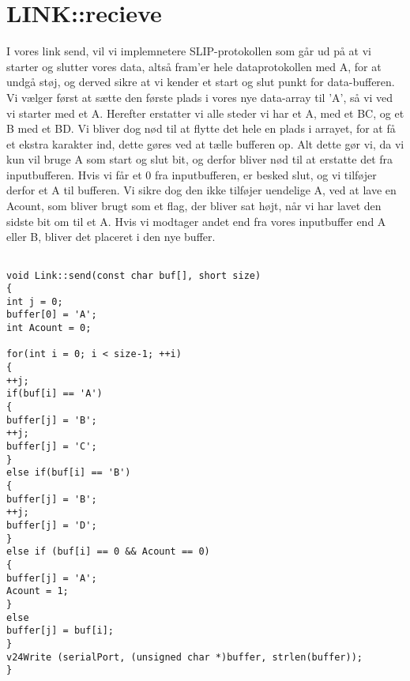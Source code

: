 \graphicspath{{Chapters/Displaymontering/}}

\chapter{LINK::recieve}

\lstset{language=C++}          %


I vores link send, vil vi implemnetere SLIP-protokollen som går ud på at vi starter og slutter vores data, altså fram'er hele dataprotokollen med A, for at undgå støj, og derved sikre at vi kender et start og slut punkt for data-bufferen. Vi vælger først at sætte den første plads i vores nye data-array til 'A', så vi ved vi starter med et A. Herefter erstatter vi alle steder vi har et A, med et BC, og et B med et BD. Vi bliver dog nød til at flytte det hele en plads i arrayet, for at få et ekstra karakter ind, dette gøres ved at tælle bufferen op. Alt dette gør vi, da vi kun vil bruge A som start og slut bit, og derfor bliver nød til at erstatte det fra inputbufferen. Hvis vi får et 0 fra inputbufferen, er besked slut, og vi tilføjer derfor et A til bufferen. Vi sikre dog den ikke tilføjer uendelige A, ved at lave en Acount, som bliver brugt som et flag, der bliver sat højt, når vi har lavet den sidste bit om til et A. Hvis vi modtager andet end fra vores inputbuffer end A eller B, bliver det placeret i den nye buffer.   



\begin{lstlisting}[frame=single]  % Start your code-block

void Link::send(const char buf[], short size)
{
int j = 0;
buffer[0] = 'A';
int Acount = 0;

for(int i = 0; i < size-1; ++i)
{
++j;
if(buf[i] == 'A')
{
buffer[j] = 'B';
++j;
buffer[j] = 'C';
}
else if(buf[i] == 'B')
{
buffer[j] = 'B';
++j;
buffer[j] = 'D';
}
else if (buf[i] == 0 && Acount == 0)
{
buffer[j] = 'A';
Acount = 1;
}
else
buffer[j] = buf[i];
}
v24Write (serialPort, (unsigned char *)buffer, strlen(buffer));
}
\end{lstlisting}
